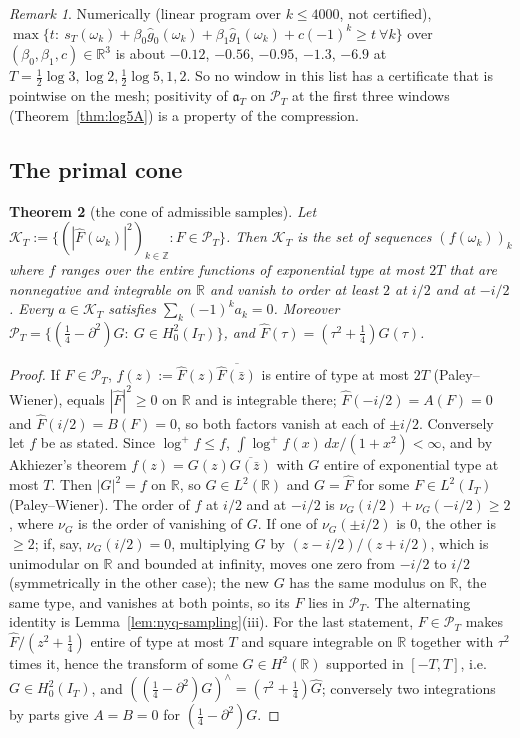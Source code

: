 \documentclass[11pt]{amsart}
\newtheorem{theorem}{Theorem}[section]
\theoremstyle{definition}
\theoremstyle{remark}
\newtheorem{remark}[theorem]{Remark}
\newcommand{\R}{\mathbb R}
\newcommand{\Z}{\mathbb Z}
\newcommand{\PT}{\mathcal P_T}
\newcommand{\IT}{I_T}
\newcommand{\gh}[1]{\widehat g_{#1}}
\newcommand{\Fh}{\widehat F}
\begin{document}
\begin{remark}\label{rem:nyq-pointwise}
Numerically (linear program over $k\le4000$, not certified), $\max\{t:\ s_T(\omega_k)+\beta_0\gh0(\omega_k)+
\beta_1\gh1(\omega_k)+c(-1)^k\ge t\ \forall k\}$ over $(\beta_0,\beta_1,c)\in\R^3$ is about $-0.12$, $-0.56$, $-0.95$,
$-1.3$, $-6.9$ at $T=\frac12\log3,\log2,\frac12\log5,1,2$. So no window in this list has a certificate that is
pointwise on the mesh; positivity of $\mathfrak a_T$ on $\PT$ at the first three windows
(Theorem~\ref{thm:log5A}) is a property of the compression.
\end{remark}

\subsection{The primal cone}

\begin{theorem}[the cone of admissible samples]\label{thm:nyq-cone}
Let $\mathcal K_T:=\{(|\Fh(\omega_k)|^2)_{k\in\Z}:F\in\PT\}$. Then $\mathcal K_T$ is the set of sequences $(f(\omega_k))_k$
where $f$ ranges over the entire functions of exponential type at most $2T$ that are nonnegative and integrable on $\R$
and vanish to order at least $2$ at $i/2$ and at $-i/2$. Every $a\in\mathcal K_T$ satisfies $\sum_k(-1)^ka_k=0$.
Moreover $\PT=\{(\frac14-\partial^2)G:\ G\in H^2_0(\IT)\}$, and $\Fh(\tau)=(\tau^2+\frac14)\widehat G(\tau)$.
\end{theorem}

\begin{proof}
If $F\in\PT$, $f(z):=\Fh(z)\overline{\Fh(\bar z)}$ is entire of type at most $2T$ (Paley--Wiener), equals $|\Fh|^2\ge0$
on $\R$ and is integrable there; $\Fh(-i/2)=A(F)=0$ and $\Fh(i/2)=B(F)=0$, so both factors vanish at each of
$\pm i/2$. Conversely let $f$ be as stated. Since $\log^+f\le f$, $\int\log^+f(x)\,dx/(1+x^2)<\infty$, and by
Akhiezer's theorem \cite[\S7.5]{Boas1954} $f(z)=G(z)\overline{G(\bar z)}$ with $G$ entire of exponential type at most
$T$. Then $|G|^2=f$ on $\R$, so $G\in L^2(\R)$ and $G=\Fh$ for some $F\in L^2(\IT)$ (Paley--Wiener). The order of $f$
at $i/2$ and at $-i/2$ is $\nu_G(i/2)+\nu_G(-i/2)\ge2$, where $\nu_G$ is the order of vanishing of $G$. If one of
$\nu_G(\pm i/2)$ is $0$, the other is $\ge2$; if, say, $\nu_G(i/2)=0$, multiplying $G$ by $(z-i/2)/(z+i/2)$, which is unimodular on $\R$ and
bounded at infinity, moves one zero from $-i/2$ to $i/2$ (symmetrically in the other case); the new $G$ has the same modulus on $\R$, the
same type, and vanishes at both points, so its $F$ lies in $\PT$. The alternating identity is
Lemma~\ref{lem:nyq-sampling}(iii). For the last statement, $F\in\PT$ makes $\Fh/(z^2+\frac14)$ entire of type at most
$T$ and square integrable on $\R$ together with $\tau^2$ times it, hence the transform of some $G\in H^2(\R)$
supported in $[-T,T]$, i.e.\ $G\in H^2_0(\IT)$, and $((\frac14-\partial^2)G)^\wedge=(\tau^2+\frac14)\widehat G$;
conversely two integrations by parts give $A=B=0$ for $(\frac14-\partial^2)G$.
\end{proof}
\end{document}
